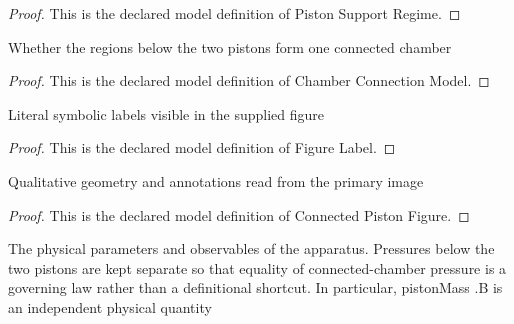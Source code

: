 \begin{proof}
  This is the declared model definition of Piston Support Regime.
\end{proof}
\begin{definition}
  \label{def:physics:phyx-mini-0390:phyxminiproblems-problemphyxmini0390-chamberconnectionmodel}
  Whether the regions below the two pistons form one connected chamber
\end{definition}
\begin{proof}
  This is the declared model definition of Chamber Connection Model.
\end{proof}
\begin{definition}
  \label{def:physics:phyx-mini-0390:phyxminiproblems-problemphyxmini0390-figurelabel}
  Literal symbolic labels visible in the supplied figure
\end{definition}
\begin{proof}
  This is the declared model definition of Figure Label.
\end{proof}
\begin{definition}
  \label{def:physics:phyx-mini-0390:phyxminiproblems-problemphyxmini0390-connectedpistonfigure}
  Qualitative geometry and annotations read from the primary image
\end{definition}
\begin{proof}
  This is the declared model definition of Connected Piston Figure.
\end{proof}
\begin{definition}
  \label{def:physics:phyx-mini-0390:phyxminiproblems-problemphyxmini0390-connectedpistonsetup}
  The physical parameters and observables of the apparatus. Pressures below the two pistons are kept separate so that equality of connected-chamber pressure is a governing law rather than a definitional shortcut. In particular, pistonMass .B is an independent physical quantity
\end{definition}
